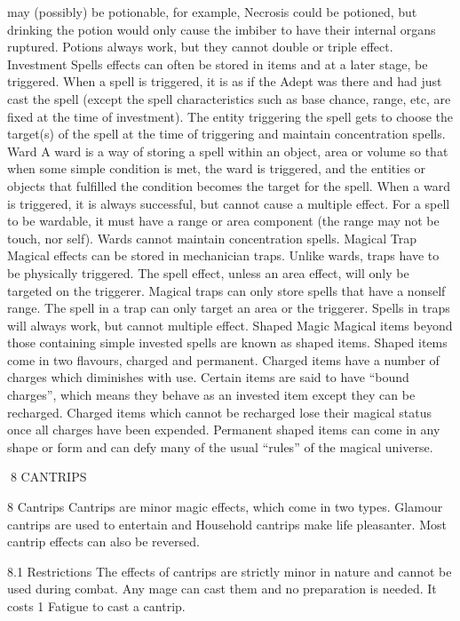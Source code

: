 \documentclass[a4paper]{article}
\begin{document}
\begin{multicols}{3}
may (possibly) be potionable, for example, Necrosis could be potioned, but drinking the potion
would only cause the imbiber to have their internal
organs ruptured. Potions always work, but they
cannot double or triple effect.
Investment Spells effects can often be stored in
items and at a later stage, be triggered. When a
spell is triggered, it is as if the Adept was there and
had just cast the spell (except the spell characteristics such as base chance, range, etc, are fixed at the
time of investment). The entity triggering the spell
gets to choose the target(s) of the spell at the time
of triggering and maintain concentration spells.
Ward A ward is a way of storing a spell within an
object, area or volume so that when some simple
condition is met, the ward is triggered, and the
entities or objects that fulfilled the condition becomes the target for the spell. When a ward is
triggered, it is always successful, but cannot cause
a multiple effect. For a spell to be wardable, it must
have a range or area component (the range may not
be touch, nor self). Wards cannot maintain concentration spells.
Magical Trap Magical effects can be stored in
mechanician traps. Unlike wards, traps have to be
physically triggered. The spell effect, unless an
area effect, will only be targeted on the triggerer.
Magical traps can only store spells that have a nonself range. The spell in a trap can only target an
area or the triggerer. Spells in traps will always
work, but cannot multiple effect.
Shaped Magic Magical items beyond those containing simple invested spells are known as shaped
items. Shaped items come in two flavours, charged
and permanent. Charged items have a number of
charges which diminishes with use. Certain items
are said to have “bound charges”, which means
they behave as an invested item except they can be
recharged. Charged items which cannot be recharged lose their magical status once all charges
have been expended. Permanent shaped items can
come in any shape or form and can defy many of
the usual “rules” of the magical universe.

8 CANTRIPS

8 Cantrips
Cantrips are minor magic effects, which come in
two types. Glamour cantrips are used to entertain
and Household cantrips make life pleasanter. Most
cantrip effects can also be reversed.

8.1 Restrictions
The effects of cantrips are strictly minor in nature
and cannot be used during combat. Any mage can
cast them and no preparation is needed. It costs 1
Fatigue to cast a cantrip.


\end{multicols}
\end{document}
